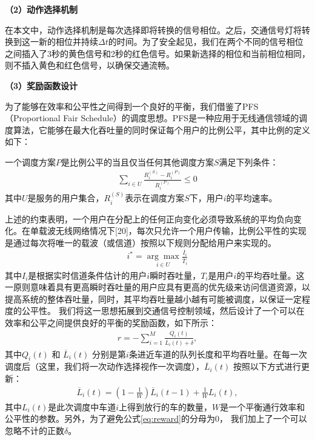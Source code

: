 \textbf{（2）动作选择机制}

在本文中，动作选择机制是每次选择即将转换的信号相位。之后，交通信号灯将转换到这一新的相位并持续$\Delta t$的时间。为了安全起见，我们在两个不同的信号相位之间插入了3秒的黄色信号和2秒的红色信号。如果新选择的相位和当前相位相同，则不插入黄色和红色信号，以确保交通流畅。

\textbf{（3）奖励函数设计}

为了能够在效率和公平性之间得到一个良好的平衡，我们借鉴了PFS（Proportional Fair Schedule）的调度思想。PFS是一种应用于无线通信领域的调度算法，它能够在最大化吞吐量的同时保证每个用户的比例公平，其中比例的定义如下：
\begin{definition}[比例公平]
\label{def:PFS}
一个调度方案$P$是比例公平的当且仅当任何其他调度方案$S$满足下列条件：
\begin{align}
    \sum_{i \in U} \frac{R_{i}^{(S)}-R_{i}^{(P)}}{R_{i}^{(P)}} \leq 0
\end{align}
其中$U$是服务的用户集合，$R_i^{(S)}$表示在调度方案$S$下，用户$i$的平均速率。
\end{definition}
上述的约束表明，一个用户在分配上的任何正向变化必须导致系统的平均负向变化。在单载波无线网络情况下[20]，每次只允许一个用户传输，比例公平性的实现是通过每次将唯一的载波（或信道）按照以下规则分配给用户来实现的。
\begin{align}
    i^*=\underset{i\in U}{\arg \max } \frac{I_{i}}{\bar{T}_{i}}
\end{align}
其中$I_i$是根据实时信道条件估计的用户$i$瞬时吞吐量，$T_i$是用户$i$的平均吞吐量。这一原则意味着具有更高瞬时吞吐量的用户应具有更高的优先级来访问信道资源，以提高系统的整体吞吐量，同时，其平均吞吐量越小越有可能被调度，以保证一定程度的公平性。
我们将这一思想拓展到交通信号控制领域，然后设计了一个可以在效率和公平之间提供良好的平衡的奖励函数，如下所示：
\begin{align}
\label{eq:reward}
    r = -\sum_{i=1}^{M} \frac{Q_i(t)}{\overline{L}_i(t) + \delta},
\end{align}
其中$Q_i(t)$ 和 $\overline{L}_i(t)$ 分别是第$i$条进近车道的队列长度和平均吞吐量。在每一次调度后（这里，我们将一次动作选择视作一次调度），$\overline{L}_i(t)$ 按照以下方式进行更新：
\begin{align}
    \label{eq:li-update}
    \overline{L}_i(t) = (1-\frac{1}{W})\overline{L}_i(t-1) + \frac{1}{W}L_i(t),
\end{align}
其中$L_i(t)$是此次调度中车道$i$上得到放行的车的数量，$W$是一个平衡通行效率和公平性的参数。另外，为了避免公式\ref{eq:reward}的分母为0， 我们加上了一个可以忽略不计的正数$\delta$。

